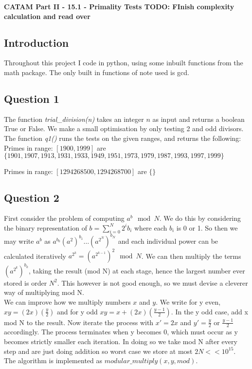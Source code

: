 \documentclass[10pt,a4paper]{report}
\begin{document}
\textbf{CATAM Part II - 15.1 - Primality Tests TODO: FInish complexity calculation and read over}
\thispagestyle{empty}

\newpage

\subsection*{Introduction}

Throughout this project I code in python, using some inbuilt functions from the math package. The only built in functions of note used is gcd.

\subsection*{Question 1}


The function \textit{trial\_division(n)} takes an integer $n$ as input and returns a boolean True or False. We make a small optimisation by only testing 2 and odd divisors. The function \textit{q1()} runs the tests on the given ranges, and returns the following:\\

Primes in range: $[1900, 1999]$ are  $\{1901, 1907, 1913, 1931, 1933   ,1949, 1951, 1973, 1979, 1987, 1993, 1997, 1999\}$

Primes in range: $ [1294268500, 1294268700]$ are $\{\}$

\subsection*{Question 2}

First consider the problem of computing $a^b \mod{N}$. We do this by considering the binary representation of $b = \sum_{i=0}^N 2^i b_i$ where each $b_i$ is 0 or 1. So then we may write $a^b$ as $a^{b_0} (a^2)^{b_1} \ldots (a^{2^N})^{b_N}$ and each individual power  can be calculated iteratively $a^{2^k} =  (a^{2^{k-1}})^2  \mod N$. We can then multiply the terms $(a^{2^k})^{b_k}$, taking the result (mod N) at each stage, hence the largest number ever stored is order $N^2$. This however is not good enough, so we must devise a cleverer way of multiplying mod N.\\

We can improve how we multiply numbers $x$ and $y$. We write for y even, $xy = (2x)(\frac{y}{2})$ and for y odd $xy = x+ (2x)(\frac{y-1}{2})$. In the y odd case, add x mod N to the result. Now iterate the process with $x'=2x$ and $y'=\frac{y}{2}$ or $\frac{y-1}{2}$ accordingly. The process terminates when y becomes 0, which must occur as y becomes strictly smaller each iteration. In doing so we take mod N after every step and are just doing addition so worst case we store at most $2N << 10^{15}$. The algorithm is implemented as $modular\_multiply(x,y,mod)$.\\
\end{document}
